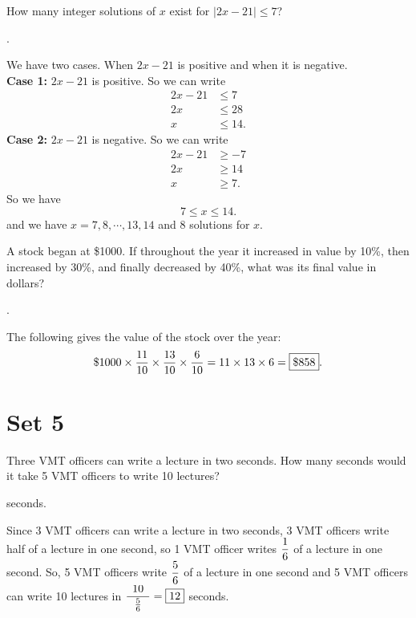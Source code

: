 \documentclass[11pt]{article}
\DeclareRobustCommand{\frac}[3][0pt]{%
  {\begingroup\hspace{#1}#2\hspace{#1}\endgroup\over\hspace{#1}#3\hspace{#1}}}
\begin{document}
\begin{problem}
How many integer solutions of $x$ exist for $\left| 2x-21 \right| \leq 7$?
\end{problem}
\begin{answer}
.
\end{answer}
\begin{solution}
We have two cases. When $2x-21$ is positive and when it is negative. \\
\textbf{Case 1:} $2x-21$ is positive.
So we can write
\begin{align*}
2x-21 &\leq 7 \\
2x &\leq 28 \\
x &\leq 14.
\end{align*}
\textbf{Case 2:} $2x-21$ is negative.
So we can write
\begin{align*}
2x-21 &\geq -7 \\
2x &\geq 14 \\
x &\geq 7.
\end{align*}
So we have
$$7 \leq x \leq 14.$$
and we have $x = 7, 8, \cdots, 13, 14$ and $\boxed{8}$ solutions for $x$.
\end{solution}

\begin{problem}
A stock began at \$1000. If throughout the year it increased in value by 10\%, then increased by 30\%,
and finally decreased by 40\%, what was its final value in dollars?
\end{problem}
\begin{answer}
. 
\end{answer}
\begin{solution}
The following gives the value of the stock over the year:
$$ \$1000 \times \frac{11}{10} \times \frac{13}{10} \times \frac{6}{10} = 11 \times 13 \times 6 = \boxed{\$858}.$$
\end{solution}

\eject

\section*{Set 5}

\begin{problem}Three VMT officers can write a lecture in two seconds. How many seconds would it take 5 VMT officers to write 10 lectures?
\end{problem}

\begin{answer}  seconds. \end{answer}
\begin{solution}
Since 3 VMT officers can write a lecture in two seconds, 3 VMT officers write half of a lecture in one second, so 1 VMT officer writes $\displaystyle \frac{1}{6}$ of a lecture in one second. So, 5 VMT officers write $\displaystyle \frac{5}{6}$ of a lecture in one second and 5 VMT officers can write 10 lectures in $\displaystyle \frac[5pt]{10}{\frac{5}{6}} = \boxed{12}$ seconds.
\end{solution}
\end{document}
